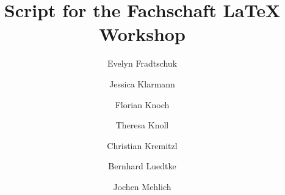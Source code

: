 
\title{Script for the Fachschaft  \LaTeX{} Workshop}
\author{Evelyn Fradtschuk \and Jessica Klarmann \and Florian Knoch \and Theresa Knoll \and Christian Kremitzl \and Bernhard Luedtke \and Jochen Mehlich}


\frenchspacing


\thispagestyle{empty}
\newpage
\setcounter{page}{1} %
\setcounter{tocdepth}{2}
\tableofcontents
\newpage

















